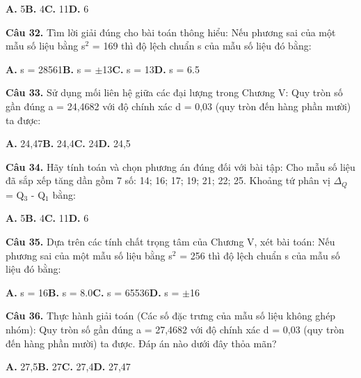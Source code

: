 \documentclass[11pt,a4paper]{article}
\begin{document}
\hspace*{1.5em}\textbf{A.} 5\quad\quad \textbf{B.} 4\quad\quad \textbf{C.} 11\quad\quad \textbf{D.} 6\par\vspace{2pt}
\textbf{\color{primary} Câu 32.} Tìm lời giải đúng cho bài toán thông hiểu: Nếu phương sai của một mẫu số liệu bằng s$^2$ = 169 thì độ lệch chuẩn s của mẫu số liệu đó bằng:\par
\hspace*{1.5em}\textbf{A.} s = 28561\quad\quad \textbf{B.} s = $\pm$13\quad\quad \textbf{C.} s = 13\quad\quad \textbf{D.} s = 6.5\par\vspace{2pt}
\textbf{\color{primary} Câu 33.} Sử dụng mối liên hệ giữa các đại lượng trong Chương V: Quy tròn số gần đúng a = 24,4682 với độ chính xác d = 0,03 (quy tròn đến hàng phần mười) ta được:\par
\hspace*{1.5em}\textbf{A.} 24,47\quad\quad \textbf{B.} 24,4\quad\quad \textbf{C.} 24\quad\quad \textbf{D.} 24,5\par\vspace{2pt}
\textbf{\color{primary} Câu 34.} Hãy tính toán và chọn phương án đúng đối với bài tập: Cho mẫu số liệu đã sắp xếp tăng dần gồm 7 số: 14; 16; 17; 19; 21; 22; 25. Khoảng tứ phân vị $\Delta_Q$ = Q$_3$ - Q$_1$ bằng:\par
\hspace*{1.5em}\textbf{A.} 5\quad\quad \textbf{B.} 4\quad\quad \textbf{C.} 11\quad\quad \textbf{D.} 6\par\vspace{2pt}
\textbf{\color{primary} Câu 35.} Dựa trên các tính chất trọng tâm của Chương V, xét bài toán: Nếu phương sai của một mẫu số liệu bằng s$^2$ = 256 thì độ lệch chuẩn s của mẫu số liệu đó bằng:\par
\hspace*{1.5em}\textbf{A.} s = 16\quad\quad \textbf{B.} s = 8.0\quad\quad \textbf{C.} s = 65536\quad\quad \textbf{D.} s = $\pm$16\par\vspace{2pt}
\textbf{\color{primary} Câu 36.} Thực hành giải toán (Các số đặc trưng của mẫu số liệu không ghép nhóm): Quy tròn số gần đúng a = 27,4682 với độ chính xác d = 0,03 (quy tròn đến hàng phần mười) ta được. Đáp án nào dưới đây thỏa mãn?\par
\hspace*{1.5em}\textbf{A.} 27,5\quad\quad \textbf{B.} 27\quad\quad \textbf{C.} 27,4\quad\quad \textbf{D.} 27,47\par\vspace{2pt}
\end{document}
